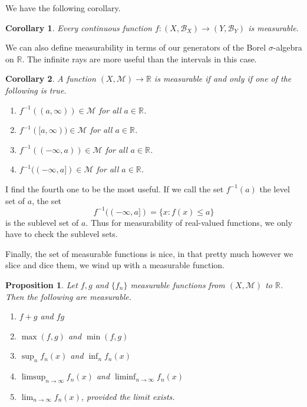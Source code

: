 \documentclass[10pt]{article}         %
\newtheorem{proposition}{Proposition}[section]
\newtheorem{corollary}{Corollary}[section]
\theoremstyle{remark}
\newcommand{\R}{\mathbb{R}}
\begin{document}
We have the following corollary.

\begin{corollary}
Every continuous function $f: (X,\mathcal{B}_X) \rightarrow (Y,\mathcal{B}_Y)$ is measurable.
\end{corollary}

We can also define measurability in terms of our generators of the Borel $\sigma$-algebra on $\R$. The infinite rays are more useful than the intervals in this case.

\begin{corollary}
A function $(X,\mathcal{M}) \rightarrow \R$ is measurable if and only if one of the following is true.
\begin{enumerate}
    \item $f^{-1}((a,\infty)) \in \mathcal{M}$ for all $a \in \R$.
    \item $f^{-1}([a,\infty)) \in \mathcal{M}$ for all $a \in \R$.
    \item $f^{-1}((-\infty,a)) \in \mathcal{M}$ for all $a \in \R$.
    \item $f^{-1}((-\infty,a]) \in \mathcal{M}$ for all $a \in \R$.
\end{enumerate}
\end{corollary}

I find the fourth one to be the most useful. If we call the set $f^{-1}(a)$ the level set of $a$, the set 
\[
f^{-1}((-\infty,a]) = \{ x : f(x) \leq a \}
\]
is the sublevel set of $a$. Thus for measurability of real-valued functions, we only have to check the sublevel sets.

Finally, the set of measurable functions is nice, in that pretty much however we slice and dice them, we wind up with a measurable function.

\begin{proposition}
Let $f, g$ and $\{ f_n \}$ measurable functions from $(X, \mathcal{M})$ to $\R$. Then the following are measurable.
\begin{enumerate}
\item $f + g$ and $fg$
\item $\max(f, g)$ and $\min(f, g)$
\item $\sup_n f_n(x)$ and $\inf_n f_n(x)$
\item $\limsup_{n\rightarrow\infty} f_n(x)$ and $\liminf_{n\rightarrow\infty} f_n(x)$
\item $\lim_{n\rightarrow\infty} f_n(x)$, provided the limit exists.
\end{enumerate}
\end{proposition}
\end{document}
